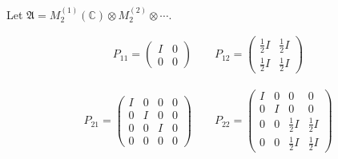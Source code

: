\documentclass{beamer}
\newcommand{\AAA}{\mathfrak A}
\newcommand{\C}{\mathbb C }
\begin{document}
\begin{frame}
Let $\AAA = M_{2}^{(1)}(\C) \otimes M_{2}^{(2)} \otimes \cdots$.

\begin{align*}
P_{11} = \begin{pmatrix}
I & 0\\
0 & 0
\end{pmatrix} \qquad
P_{12} = \begin{pmatrix}
\frac{1}{2}I & \frac{1}{2}I\\
\frac{1}{2}I & \frac{1}{2}I
\end{pmatrix}
\end{align*}

\begin{align*}
P_{21} = \begin{pmatrix}
I & 0 & 0 & 0\\
0 & I & 0 & 0 \\
0 & 0 & I & 0 \\
0 & 0 & 0 & 0
\end{pmatrix} \qquad
P_{22} = \begin{pmatrix}
I & 0 & 0 & 0\\
0 & I & 0 & 0\\
0 & 0 & \frac{1}{2}I & \frac{1}{2}I\\
0 & 0 & \frac{1}{2}I & \frac{1}{2}I
\end{pmatrix}
\end{align*}

\end{frame}
\end{document}
